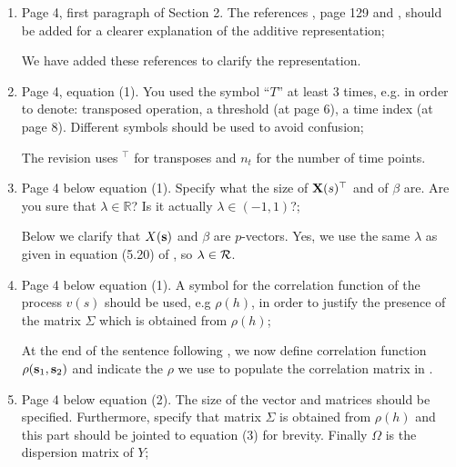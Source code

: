 \documentclass[11pt]{article}
\begin{document}
\begin{enumerate}[1.]
  \item Page 4, first paragraph of Section 2. The references \citet{Beranger2016}, \citet{Azzalini2014} page 129 and \citet{Azzalini2003}, should be added for a clearer explanation of the additive representation; \\

  \begin{response}
    We have added these references to clarify the representation.
  \end{response}

  \item Page 4, equation (1). You used the symbol ``$T$'' at least 3 times, e.g. in order to denote: transposed operation, a threshold (at page 6), a time index (at page 8). Different symbols should be used to avoid confusion; \\

  \begin{response}
    The revision uses $^\top$ for transposes and $n_t$ for the number of time points.
  \end{response}

  \item Page 4 below equation (1). Specify what the size of $\mbox{\bf X}(s)^\top$ and of $\beta$ are. Are you sure that $\lambda \in \mathbb{R}$? Is it actually $\lambda \in (-1,1)$?; \\

    \begin{response}
      Below  we clarify that $X(\mbox{\bf s})$ and $\beta$ are $p$-vectors.
      Yes, we use the same $\lambda$ as given in equation (5.20) of \citet[p. 129]{Azzalini2014}, so $\lambda \in {\cal R}$.
    \end{response}

  \item Page 4 below equation (1). A symbol for the correlation function of the process $v(s)$ should be used, e.g $\rho(h)$, in order to justify the presence of the matrix $\Sigma$ which is obtained from $\rho(h)$; \\

    \begin{response}
      At the end of the sentence following , we now define correlation function $\rho(\mbox{\bf s}_1, \mbox{\bf s}_2)$ and indicate the $\rho$ we use to populate the correlation matrix in .
    \end{response}

  \item Page 4 below equation (2). The size of the vector and matrices should be specified. Furthermore, specify that matrix $\Sigma$ is obtained from $\rho(h)$ and this part should be jointed to equation (3) for brevity. Finally $\Omega$ is the dispersion matrix of $Y$; \\


\end{enumerate}
\end{document}
